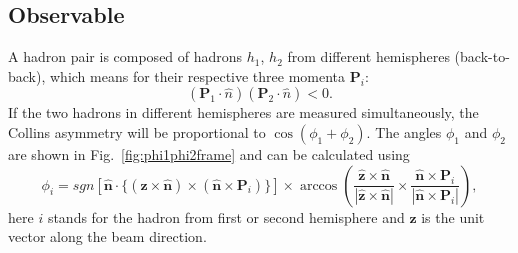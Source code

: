 \subsection{Observable}
\label{sec:observable}
A hadron pair is composed of hadrons $h_1$, $h_2$ from different hemispheres (back-to-back), which means for their respective three momenta $\boldsymbol{P}_{i}$:
\begin{equation}
(\boldsymbol{P}_{1} \cdot \hat{n})(\boldsymbol{P}_{2}\cdot \hat{n}) < 0 .
\end{equation}
If the two hadrons in different hemispheres are measured simultaneously, the Collins asymmetry will be proportional to $\cos(\phi_1+\phi_2)$. The angles $\phi_1$ and $\phi_2$ are shown in Fig.~\ref{fig:phi1phi2frame} and can be calculated using
\begin{equation}
\phi_i=sgn[\hat{\boldsymbol{n}}\cdot \{ (\boldsymbol{z}\times\hat{\boldsymbol{n}})\times(\hat{\boldsymbol{n}}\times{\boldsymbol{P}_{i}})\}]\times \arccos(\frac{\hat{\boldsymbol{z}}\times\hat{\boldsymbol{n}}}{|\hat{\boldsymbol{z}}\times\hat{\boldsymbol{n}}|}\times\frac{\hat{\boldsymbol{n}}\times{\boldsymbol{P}_{i}}}{|\hat{\boldsymbol{n}}\times{\boldsymbol{P}_{i}}|}),
\label{eqn:collinsangledefine2}
\end{equation}
here $i$ stands for the hadron from first or second hemisphere and $\boldsymbol{z}$ is the unit vector along the beam direction.

